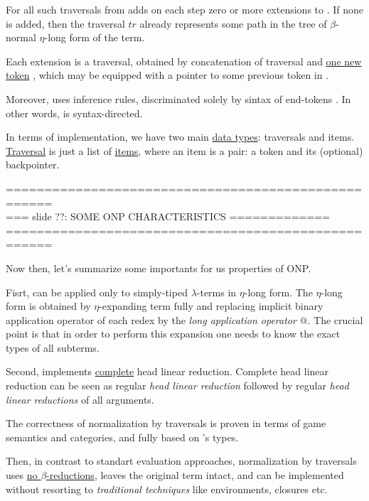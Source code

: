 \documentclass[a4paper, 10pt]{article} %
\newcommand{\red}[1]{{\color{red}#1}}
\newcommand{\green}[1]{{\color{blue!20!black!30!green}#1}}
\newcommand{\blue}[1]{{\color{blue}#1}}
\newcommand{\lam}[1]{{\color{brown}\textit{\boldmath{#1}}}}
\begin{document}
For all such traversals from \lam{$\mathfrak{Trav}(M)$} \lam{ONP} adds on each step zero or more extensions to \lam{$\mathfrak{Trav}(M)$}. 
If none is added, then the traversal $tr$ already represents some path in the tree of $\beta$-normal $\eta$-long form of the term.

Each extension is a traversal, obtained by concatenation of traversal \lam{$tr$} and \underline{one new token} \lam{$t'$}, which 
may be equipped with a pointer to some previous token in \lam{$tr$}.

Moreover, \lam{ONP} uses inference rules, discriminated solely by sintax of end-tokens \lam{$t_n$}. 
In other words, \lam{ONP} is \blue{syntax-directed}.

In terms of implementation, we have two main \underline{data types}: traversals and items. \underline{Traversal} is just a list 
of \underline{items}, where an item is a pair: a token and its (optional) backpointer.

====================================================\\
=== slide ??: SOME ONP CHARACTERISTICS =============\\
====================================================

Now then, let's summarize some importants for us properties of \green{ONP}.

Fisrt, \lam{ONP} can be applied only to \blue{simply-tiped} $\lambda$-terms in \blue{$\eta$-long form}.
The $\eta$-long form is obtained by $\eta$-expanding term fully and replacing implicit binary 
application operator of each redex by the \textit{long application operator} $@$. The crucial
point is that in order to perform this expansion one needs to know the exact types of all
subterms.

Second, \lam{ONP} implements \green{\underline{complete} head linear reduction}. Complete head linear 
reduction can be seen as regular \textit{head linear reduction} followed by regular \textit{head linear 
reductions} of all arguments.

The correctness of normalization by traversals is proven in terms of game semantics and categories, and 
fully based on \lam{$M$}'s types.

Then, in contrast to standart evaluation approaches, normalization by traversals uses 
\red{\underline{no $\beta$-reductions}}, leaves the original term intact, and 
can be implemented without resorting to \textit{traditional techniques} like environments, 
closures etc.
\end{document}
